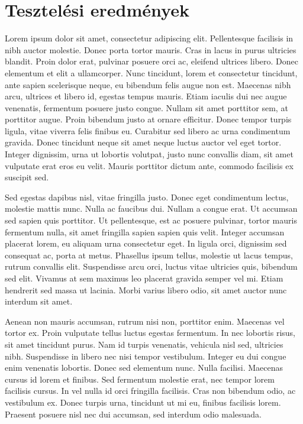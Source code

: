 \chapter{Tesztelési eredmények}
\label{appx:testing}

Lorem ipsum dolor sit amet, consectetur adipiscing elit. Pellentesque facilisis in nibh auctor molestie. Donec porta tortor mauris. Cras in lacus in purus ultricies blandit. Proin dolor erat, pulvinar posuere orci ac, eleifend ultrices libero. Donec elementum et elit a ullamcorper. Nunc tincidunt, lorem et consectetur tincidunt, ante sapien scelerisque neque, eu bibendum felis augue non est. Maecenas nibh arcu, ultrices et libero id, egestas tempus mauris. Etiam iaculis dui nec augue venenatis, fermentum posuere justo congue. Nullam sit amet porttitor sem, at porttitor augue. Proin bibendum justo at ornare efficitur. Donec tempor turpis ligula, vitae viverra felis finibus eu. Curabitur sed libero ac urna condimentum gravida. Donec tincidunt neque sit amet neque luctus auctor vel eget tortor. Integer dignissim, urna ut lobortis volutpat, justo nunc convallis diam, sit amet vulputate erat eros eu velit. Mauris porttitor dictum ante, commodo facilisis ex suscipit sed.

Sed egestas dapibus nisl, vitae fringilla justo. Donec eget condimentum lectus, molestie mattis nunc. Nulla ac faucibus dui. Nullam a congue erat. Ut accumsan sed sapien quis porttitor. Ut pellentesque, est ac posuere pulvinar, tortor mauris fermentum nulla, sit amet fringilla sapien sapien quis velit. Integer accumsan placerat lorem, eu aliquam urna consectetur eget. In ligula orci, dignissim sed consequat ac, porta at metus. Phasellus ipsum tellus, molestie ut lacus tempus, rutrum convallis elit. Suspendisse arcu orci, luctus vitae ultricies quis, bibendum sed elit. Vivamus at sem maximus leo placerat gravida semper vel mi. Etiam hendrerit sed massa ut lacinia. Morbi varius libero odio, sit amet auctor nunc interdum sit amet.

Aenean non mauris accumsan, rutrum nisi non, porttitor enim. Maecenas vel tortor ex. Proin vulputate tellus luctus egestas fermentum. In nec lobortis risus, sit amet tincidunt purus. Nam id turpis venenatis, vehicula nisl sed, ultricies nibh. Suspendisse in libero nec nisi tempor vestibulum. Integer eu dui congue enim venenatis lobortis. Donec sed elementum nunc. Nulla facilisi. Maecenas cursus id lorem et finibus. Sed fermentum molestie erat, nec tempor lorem facilisis cursus. In vel nulla id orci fringilla facilisis. Cras non bibendum odio, ac vestibulum ex. Donec turpis urna, tincidunt ut mi eu, finibus facilisis lorem. Praesent posuere nisl nec dui accumsan, sed interdum odio malesuada.